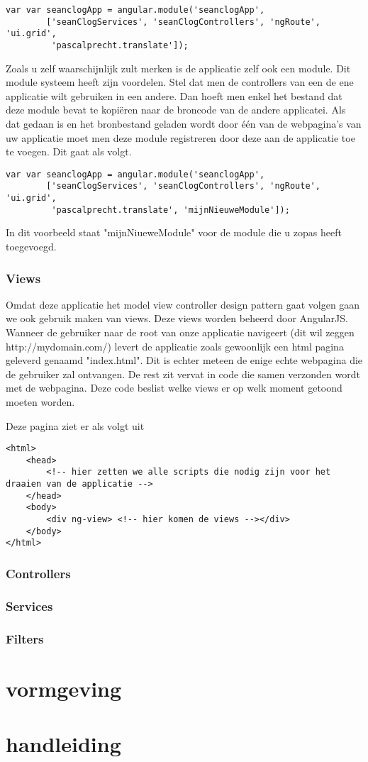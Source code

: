 \documentclass[a4paper,11pt]{article}
\begin{document}
\begin{verbatim}
var var seanclogApp = angular.module('seanclogApp',
		['seanClogServices', 'seanClogControllers', 'ngRoute', 'ui.grid',
		 'pascalprecht.translate']);
\end{verbatim}

Zoals u zelf waarschijnlijk zult merken is de applicatie zelf ook een module. Dit module systeem heeft zijn voordelen. Stel dat men de controllers van een de ene applicatie wilt gebruiken in een andere. Dan hoeft men enkel het bestand dat deze module bevat te kopiëren naar de broncode van de andere applicatei. Als dat gedaan is en het bronbestand geladen wordt door één van de webpagina's van uw applicatie moet men deze module registreren door deze aan de applicatie toe te voegen. Dit gaat als volgt.

\begin{verbatim}
var var seanclogApp = angular.module('seanclogApp',
		['seanClogServices', 'seanClogControllers', 'ngRoute', 'ui.grid',
		 'pascalprecht.translate', 'mijnNieuweModule']);
\end{verbatim}

In dit voorbeeld staat "mijnNiueweModule" voor de module die u zopas heeft toegevoegd.

\subsubsection{Views}
Omdat deze applicatie het model view controller design pattern gaat volgen gaan we ook gebruik maken van views. Deze views worden beheerd door AngularJS. Wanneer de gebruiker naar de root van onze applicatie navigeert (dit wil zeggen http://mydomain.com/) levert de applicatie zoals gewoonlijk een html pagina geleverd genaamd "index.html". Dit is echter meteen de enige echte webpagina die de gebruiker zal ontvangen. De rest zit vervat in code die samen verzonden wordt met de webpagina. Deze code beslist welke views er op welk moment getoond moeten worden.

Deze pagina ziet er als volgt uit
\begin{verbatim}
<html>
	<head>
		<!-- hier zetten we alle scripts die nodig zijn voor het draaien van de applicatie -->
	</head>
	<body>
		<div ng-view> <!-- hier komen de views --></div>
	</body>
</html>
\end{verbatim}

\subsubsection{Controllers}

\subsubsection{Services}

\subsubsection{Filters}

\section{vormgeving}



\section{handleiding}
\end{document}
